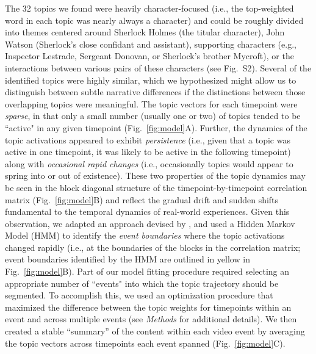 \documentclass{article}
\newcommand{\topics}{S2}
\begin{document}
The 32 topics we found were heavily character-focused (i.e., the top-weighted word in each topic was nearly always a character) and could be roughly divided into themes centered around Sherlock Holmes (the titular character), John Watson (Sherlock's close confidant and assistant), supporting characters (e.g., Inspector Lestrade, Sergeant Donovan, or Sherlock's brother Mycroft), or the interactions between various pairs of these characters (see Fig.~\topics).  Several of the identified topics were highly similar, which we hypothesized might allow us to distinguish between subtle narrative differences if the distinctions between those overlapping topics were meaningful.  The topic vectors for each timepoint were \textit{sparse}, in that only a small number (usually one or two) of topics tended to be ``active" in any given timepoint (Fig.~\ref{fig:model}A).  Further, the dynamics of the topic activations appeared to exhibit \textit{persistence} (i.e., given that a topic was active in one timepoint, it was likely to be active in the following timepoint) along with \textit{occasional rapid changes} (i.e., occasionally topics would appear to spring into or out of existence).  These two properties of the topic dynamics may be seen in the block diagonal structure of the timepoint-by-timepoint correlation matrix (Fig.~\ref{fig:model}B) and reflect the gradual drift and sudden shifts fundamental to the temporal dynamics of real-world experiences.  Given this observation, we adapted an approach devised by \cite{BaldEtal17}, and used a Hidden Markov Model (HMM) to identify the \textit{event boundaries} where the topic activations changed rapidly (i.e., at the boundaries of the blocks in the correlation matrix; event boundaries identified by the HMM are outlined in yellow in Fig.~\ref{fig:model}B).  Part of our model fitting procedure required selecting an appropriate number of ``events" into which the topic trajectory should be segmented.  To accomplish this, we used an optimization procedure that maximized the difference between the topic weights for timepoints within an event and across multiple events (see \textit{Methods} for additional details).  We then created a stable ``summary'' of the content within each video event by averaging the topic vectors across timepoints each event spanned (Fig.~\ref{fig:model}C).
\end{document}
